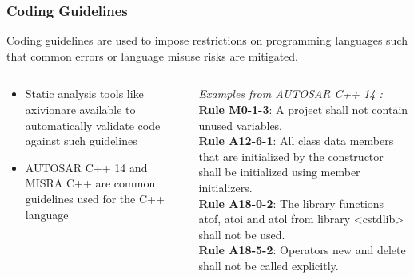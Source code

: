 
\begin{frame}
\frametitle{Coding Guidelines}
Coding guidelines are used to impose restrictions on programming languages such
that common errors or language misuse risks are mitigated.\\
\begin{columns}[]
    \begin{column}{0.5\textwidth}
        \begin{itemize}
            \item Static analysis tools like axivion\footnotemark[1] are available
                to automatically validate code against such guidelines
            \item AUTOSAR C++ 14 \cite{AutosarCpp14} and MISRA C++ \cite{MisraCpp} are
                common guidelines used for the C++ language
        \end{itemize} 
    \end{column}
    \begin{column}{0.5\textwidth}
        \emph{Examples from AUTOSAR C++ 14 \cite{AutosarCpp14}:}\\
        \vspace{0.25cm}
        \footnotesize
        \textbf{Rule M0-1-3}: A project shall not contain unused variables.\\
        \vspace{0.1cm}
        \textbf{Rule A12-6-1}: All class data members that are initialized by the
        constructor shall be initialized using member initializers.\\
        \vspace{0.1cm}
        \textbf{Rule A18-0-2}: The library functions atof, atoi and atol from
        library <cstdlib> shall not be used.\\
        \vspace{0.1cm}
        \textbf{Rule A18-5-2}: Operators new and delete shall not be called
        explicitly.\\
    \end{column}
\end{columns}
\end{frame}

